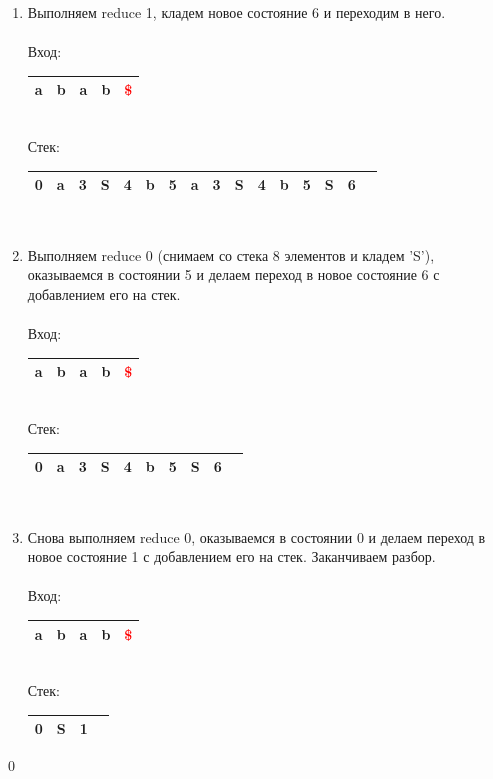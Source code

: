 \begin{example}
\begin{enumerate}
\begin{tabular}[c]{ |c|c|c|c|c|c|c|c|c|c|c|c|c|c }
\end{tabular}
\\
\item Выполняем reduce 1, кладем новое состояние 6 и переходим в него. \\ \\
Вход: \,
\begin{tabular}[c]{ |c|c|c|c|c| }
    \hline a & b & a & b & \textcolor{red}{\$} \\ \hline
\end{tabular} \\
Стек: \,
\begin{tabular}[c]{ |c|c|c|c|c|c|c|c|c|c|c|c|c|c|c|c }
    \hline 0 & a & 3 & S & 4 & b & 5 & a & 3 & S & 4 & b & 5 & S & 6 & \\ \hline
\end{tabular}
\\
\item Выполняем reduce 0 (снимаем со стека 8 элементов и кладем 'S'), оказываемся в состоянии 5 и делаем переход в новое состояние 6 с добавлением его на стек. \\ \\
Вход: \,
\begin{tabular}[c]{ |c|c|c|c|c| }
    \hline a & b & a & b & \textcolor{red}{\$} \\ \hline
\end{tabular}\\
Стек: \,
\begin{tabular}[c]{ |c|c|c|c|c|c|c|c|c|c }
    \hline 0 & a & 3 & S & 4 & b & 5 & S & 6 & \\ \hline
\end{tabular}
\\
\item Снова выполняем reduce 0, оказываемся в состоянии 0 и делаем переход в новое состояние 1 с добавлением его на стек. Заканчиваем разбор. \\ \\
Вход: \,
\begin{tabular}[c]{ |c|c|c|c|c| }
    \hline a & b & a & b & \textcolor{red}{\$} \\ \hline
\end{tabular} \\
Стек: \,
\begin{tabular}[c]{ |c|c|c|c }
    \hline 0 & S & 1 & \\ \hline
\end{tabular}
\end{enumerate}
\qed
\end{example}

